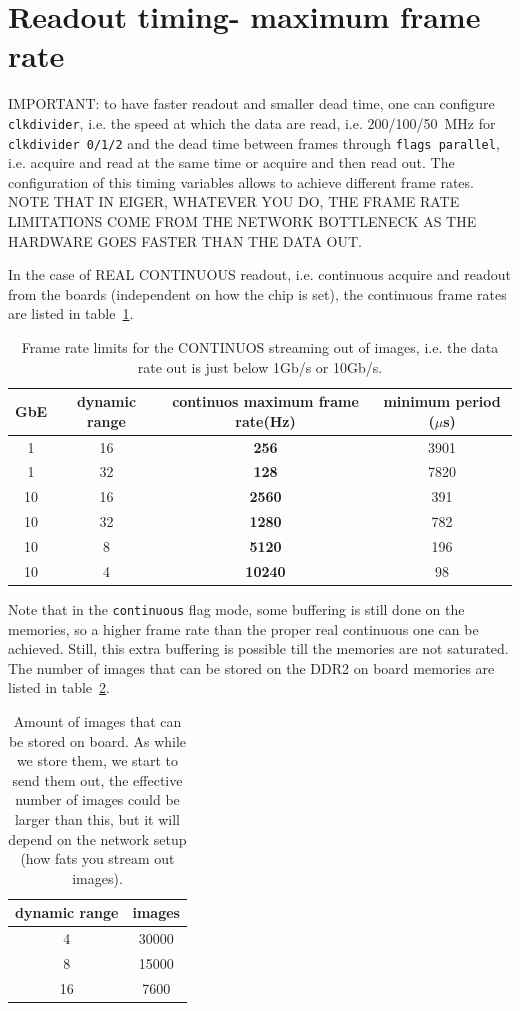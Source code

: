\documentclass{article}
\begin{document}
\section{Readout timing- maximum frame rate}\label{timing}
IMPORTANT: to have faster readout and smaller dead time, one can configure {\tt{clkdivider}}, i.e. the speed at which the data are read, i.e. 200/100/50~MHz for {\tt{clkdivider 0/1/2}} and the dead time between frames through {\tt{flags parallel}}, i.e. acquire and read at the same time or acquire and then read out.
The configuration of this timing variables allows to achieve different frame rates. NOTE THAT IN EIGER, WHATEVER YOU DO, THE FRAME RATE LIMITATIONS COME FROM THE NETWORK BOTTLENECK AS THE HARDWARE GOES FASTER THAN THE DATA OUT.

In the case of REAL CONTINUOUS readout, i.e. continuous acquire and readout from the boards (independent on how the chip is set), the continuous frame rates are listed in table~\ref{tcont}.
\begin{table} 
\begin{tabular}{|c|c|c|c|}
\hline
GbE & dynamic range & continuos maximum frame rate(Hz) & minimum period ($\mu$s)\\
\hline
1 & 16 &  \textbf{256} & 3901\\ 
\hline 
1 &  32 &  \textbf{128} & 7820\\
\hline 
10 & 16 & \textbf{2560} & 391\\  
\hline 
10 & 32 & \textbf{1280}& 782\\  
\hline 
10 & 8 & \textbf{5120} & 196\\
\hline
10 & 4 & \textbf{10240} & 98\\
\hline
\end{tabular}
\caption{Frame rate limits for the CONTINUOS streaming out of images, i.e. the data rate out is just below 1Gb/s or 10Gb/s.} 
\label{tcont}\end{table}
 Note that in the {\tt{continuous}} flag mode, some buffering is still done on the memories, so a higher frame rate than the proper real continuous one can be achieved. Still, this extra buffering is possible till the memories are not saturated. The number of images that can be stored on the DDR2 on board memories are listed in table~\ref{timgs}.
\begin{table}
\begin{tabular}{|c|c|}
\hline
dynamic range & images\\
\hline
4 & 30000\\
\hline
8 & 15000\\
\hline
16 & 7600\\
\hline
\end{tabular}
\caption{Amount of images that can be stored on board. As while we store them, we start to send them out, the effective number of images could be larger than this, but it will depend on the network setup (how fats you stream out images).}
\label{timgs}
\end{table}
\end{document}
